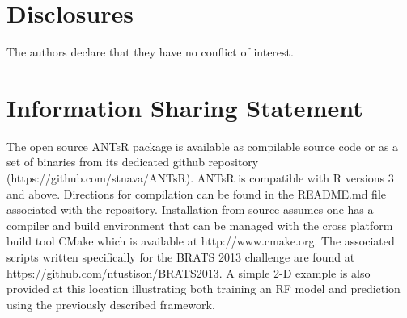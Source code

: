 \section*{Disclosures}
The authors declare that they have no conflict of interest.


\section*{Information Sharing Statement}

The open source ANTsR package is available as compilable source
code or as a set of binaries from its dedicated github
repository (https://github.com/stnava/ANTsR).  
ANTsR is compatible with R versions 3 and above.
Directions for compilation can be found in the README.md file associated 
with the repository.  Installation from source assumes one has a compiler 
and build environment that can be managed with
the cross platform build tool CMake which is available at http://www.cmake.org.  
The associated scripts written specifically
for the BRATS 2013 challenge are found at https://github.com/ntustison/BRATS2013.
A simple 2-D example is also provided at this location illustrating
both training an RF model and prediction using the previously 
described framework.  









